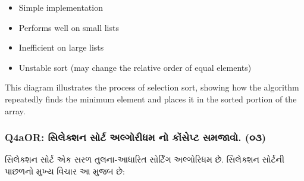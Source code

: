 \begin{enumerate}
  \begin{itemize}
  \tightlist
  \item
    Simple implementation
  \item
    Performs well on small lists
  \item
    Inefficient on large lists
  \item
    Unstable sort (may change the relative order of equal elements)
  \end{itemize}
\end{enumerate}

\begin{Shaded}
\begin{Highlighting}[]
\end{Highlighting}
\end{Shaded}

This diagram illustrates the process of selection sort, showing how the
algorithm repeatedly finds the minimum element and places it in the
sorted portion of the array.

\hypertarget{q4aor-uxab8uxab2uxa95uxab6uxaa8-uxab8uxab0uxa9f-uxa85uxab2uxa97uxab0uxaa7uxaae-uxaa8-uxa95uxab8uxaaauxa9f-uxab8uxaaeuxa9cuxab5.-uxae6uxae9}{%
\subsubsection{Q4aOR: સિલેક્શન સોર્ટ અલ્ગોરીધમ નો કોંસેપ્ટ સમજાવો.
(૦૩)}\label{q4aor-uxab8uxab2uxa95uxab6uxaa8-uxab8uxab0uxa9f-uxa85uxab2uxa97uxab0uxaa7uxaae-uxaa8-uxa95uxab8uxaaauxa9f-uxab8uxaaeuxa9cuxab5.-uxae6uxae9}}

સિલેક્શન સોર્ટ એક સરળ તુલના-આધારિત સોર્ટિંગ અલ્ગોરિધમ છે. સિલેક્શન સોર્ટની પાછળનો
મુખ્ય વિચાર આ મુજબ છે:

